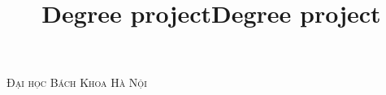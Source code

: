\documentclass[12pt]{article}
\title{Degree project}
\title{Degree project}
\begin{document}

\thispagestyle{firststyle}
\begin{center}
  \begin{minipage}{0.48\textwidth} \begin{flushleft}
  \end{flushleft}\end{minipage}
  \begin{minipage}{0.48\textwidth} \begin{flushright}
  \end{flushright}\end{minipage}

  \vspace*{-2.5cm}
  \textsc{\huge Đại học Bách Khoa Hà Nội} \\

  \vspace*{1.5cm}


\end{center}
\end{document}
